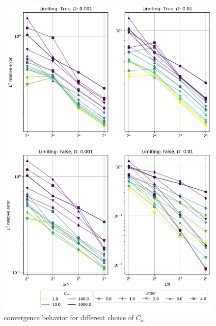 \begin{figure}[p!]
	\centering
	\includegraphics[width=\textwidth]{../figs/parametric/burgers_1D/convergences}
	\caption{ convergence behavior for different choice of $C_w$}
	\label{fig:burgess_conv}
\end{figure}
\clearpage




